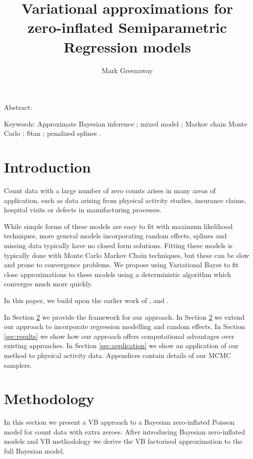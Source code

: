 \documentclass{article}[12pt]
\title{Variational approximations for zero-inflated Semiparametric Regression models}
\author{Mark Greenaway}
\begin{document}
\maketitle

Abstract:

Keywords: Approximate Bayesian inference ; mixed model ; Markov chain Monte Carlo ; Stan ; penalized splines .

\section{Introduction}

\noindent Count data with a large number of zero counts arises in many areas of
application, such as data arising from physical activity studies, 
insurance claims, hospital visits or defects in manufacturing processes.

\noindent While simple forms of these models are easy to fit with maximum likelihood techniques,
more general models incorporating random effects, splines and missing data typically
have no closed form solutions. Fitting these models is typically done with Monte Carlo
Markov Chain techniques, but these can be slow and prone to convergence problems. We
propose using Variational Bayes to fit close approximations to these models
using a deterministic algorithm which converges much more quickly.


\noindent In this paper, we build upon the earlier work of \cite{lambert1992},
\cite{Ghosh20061360} and \cite{VatsaWilson2014}.

\noindent In Section \ref{sec:methodology} we provide the framework for our approach. In
Section \ref{sec:methodology} we extend our approach to incorporate regression modelling
and random effects. In Section \ref{sec:results} we show how our approach offers 
computational advantages over existing approaches. In Section \ref{sec:application} we 
show an application of our method to physical activity data. Appendices contain details 
of our MCMC samplers.

\section{Methodology}\label{sec:methodology}

In this section we present a VB approach to a Bayesian zero-inflated Poisson model
for count data with extra zeroes. After introducing Bayesian zero-inflated models
and VB methodology we derive the VB factorised approximation to the full Bayesian
model. 
\end{document}
